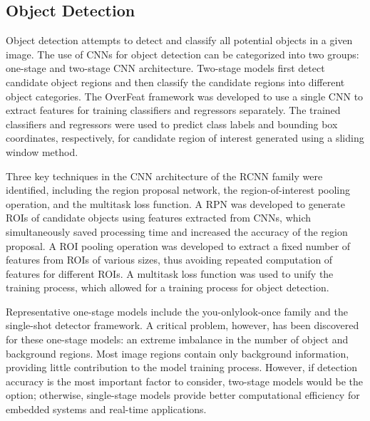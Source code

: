 \subsection{Object Detection}
Object detection attempts to detect and classify all potential objects in a given image. The use of CNNs for object detection can be categorized into two groups:
one-stage and two-stage CNN architecture. Two-stage models first detect candidate object regions and then classify the candidate regions into different object categories.
The OverFeat framework was developed to use a single CNN to extract features for training classifiers and regressors separately. The trained classifiers and regressors
were used to predict class labels and bounding box coordinates, respectively, for candidate region of interest generated using a sliding window method.

Three key techniques in the CNN architecture of the RCNN family were identified, including the region proposal network, the region-of-interest pooling operation, and
the multitask loss function. A RPN was developed to generate ROIs of candidate objects using features extracted from CNNs, which simultaneously saved processing time
and increased the accuracy of the region proposal. A ROI pooling operation was developed to extract a fixed number of features from ROIs of various sizes, thus avoiding
repeated computation of features for different ROIs. A multitask loss function was used to unify the training process, which allowed for a training process for object
detection. 

Representative one-stage models include the you-onlylook-once family and the single-shot detector framework. A critical problem, however, has been
discovered for these one-stage models: an extreme imbalance in the number of object and background regions. Most image regions contain only background information,
providing little contribution to the model training process. However, if detection accuracy is the most important factor to consider, two-stage models would be
the option; otherwise, single-stage models provide better computational efficiency for embedded systems and real-time applications.

